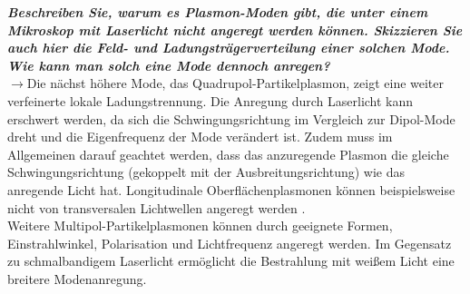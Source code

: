 \textbf{\textit{Beschreiben Sie, warum es Plasmon-Moden gibt, die unter einem Mikroskop
mit Laserlicht nicht angeregt werden können. Skizzieren Sie auch hier die Feld- und
Ladungsträgerverteilung einer solchen Mode. Wie kann man solch eine Mode dennoch anregen?}}\\
$\rightarrow$Die nächst höhere Mode, das Quadrupol-Partikelplasmon, 
zeigt eine weiter verfeinerte lokale Ladungstrennung. Die Anregung durch Laserlicht kann erschwert werden, 
da sich die Schwingungsrichtung im Vergleich zur Dipol-Mode dreht und die Eigenfrequenz der Mode verändert 
ist. Zudem muss im Allgemeinen darauf geachtet werden, dass das anzuregende Plasmon die gleiche 
Schwingungsrichtung (gekoppelt mit der Ausbreitungsrichtung) wie das anregende Licht hat.
Longitudinale Oberflächenplasmonen können beispielsweise nicht von transversalen Lichtwellen 
angeregt werden \cite{FZV2p2}. \\
Weitere Multipol-Partikelplasmonen können durch geeignete Formen, Einstrahlwinkel, Polarisation 
und Lichtfrequenz angeregt werden. 
Im Gegensatz zu schmalbandigem Laserlicht ermöglicht die Bestrahlung mit weißem 
Licht eine breitere Modenanregung. 